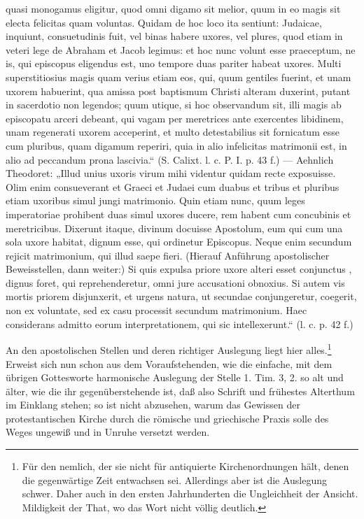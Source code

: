 quasi monogamus eligitur, quod omni digamo sit melior, quum in eo magis sit electa felicitas quam voluntas. Quidam de hoc loco ita sentiunt: Judaicae, inquiunt, consuetudinis fuit, vel binas habere uxores, vel plures, quod etiam in veteri lege de Abraham et Jacob legimus: et hoc nunc volunt esse praeceptum, ne is, qui episcopus eligendus est, uno tempore duas pariter habeat uxores. Multi superstitiosius magis quam verius etiam eos, qui, quum gentiles fuerint, et unam uxorem habuerint, qua amissa post baptismum Christi alteram duxerint, putant in sacerdotio non legendos; quum utique, si hoc observandum sit, illi magis ab episcopatu arceri debeant, qui vagam per meretrices ante exercentes libidinem, unam regenerati uxorem acceperint, et multo detestabilius sit fornicatum esse cum pluribus, quam digamum reperiri, quia in alio infelicitas matrimonii est, in alio ad peccandum prona lascivia.“ (S. Calixt. l. c. P. I. p. 43 f.) — Aehnlich Theodoret: „Illud unius uxoris virum mihi videntur quidam recte exposuisse. Olim enim consueverant et Graeci et Judaei cum duabus et tribus et pluribus etiam uxoribus simul jungi matrimonio. Quin etiam nunc, quum leges imperatoriae prohibent duas simul uxores ducere, rem habent cum concubinis et meretricibus. Dixerunt itaque, divinum docuisse Apostolum, eum qui cum una sola uxore habitat, dignum esse, qui ordinetur Episcopus. Neque enim secundum rejicit matrimonium, qui illud saepe fieri. (Hierauf Anführung apostolischer Beweisstellen, dann weiter:) Si quis expulsa priore uxore alteri esset conjunctus
, dignus foret, qui reprehenderetur, omni jure accusationi obnoxius. Si autem vis mortis priorem disjunxerit, et urgens natura, ut secundae conjungeretur, coegerit, non ex voluntate, sed ex casu processit secundum matrimonium. Haec considerans admitto eorum interpretationem, qui sic intellexerunt.“ (l. c. p. 42 f.)

An den apostolischen Stellen und deren richtiger Auslegung liegt hier alles.\footnote{Für den nemlich, der sie nicht für antiquierte Kirchenordnungen hält, denen die gegenwärtige Zeit entwachsen sei. Allerdings aber ist die Auslegung schwer. Daher auch in den ersten Jahrhunderten die Ungleichheit der Ansicht. Mildigkeit der That, wo das Wort nicht völlig deutlich.} Erweist sich nun schon aus dem Voraufstehenden, wie die einfache, mit dem übrigen Gottesworte harmonische Auslegung der Stelle 1. Tim. 3, 2. so alt und älter, wie die ihr gegenüberstehende ist, daß also Schrift und frühestes Alterthum im Einklang stehen; so ist nicht abzusehen, warum das Gewissen der protestantischen Kirche durch die römische und griechische Praxis solle des Weges ungewiß und in Unruhe versetzt werden.

